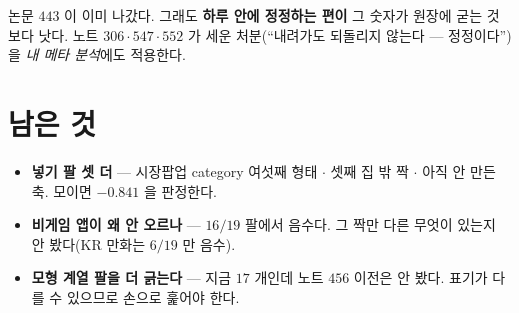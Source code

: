 \documentclass[11pt]{article}
\begin{document}
논문 $443$ 이 이미 나갔다. 그래도 \textbf{하루 안에 정정하는 편이} 그
숫자가 원장에 굳는 것보다 낫다. 노트 $306 \cdot 547 \cdot 552$ 가 세운
처분(``내려가도 되돌리지 않는다 --- 정정이다'')을 \emph{내 메타 분석}에도
적용한다.

\section*{남은 것}

\begin{itemize}
\item \textbf{넣기 팔 셋 더} --- 시장팝업 category 여섯째 형태 $\cdot$
셋째 집 밖 짝 $\cdot$ 아직 안 만든 축. 모이면 $-0.841$ 을 판정한다.
\item \textbf{비게임 앱이 왜 안 오르나} --- $16/19$ 팔에서 음수다. 그 짝만
다른 무엇이 있는지 안 봤다(KR 만화는 $6/19$ 만 음수).
\item \textbf{모형 계열 팔을 더 긁는다} --- 지금 $17$ 개인데 노트 $456$
이전은 안 봤다. 표기가 다를 수 있으므로 손으로 훑어야 한다.
\end{itemize}
\end{document}
